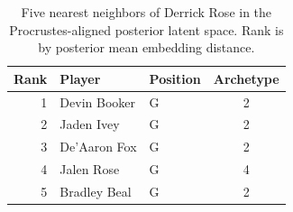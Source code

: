 \begin{table}[htbp]
  \centering\small
  \begin{tabular}{rllc}
    \toprule
    Rank & Player & Position & Archetype \\
    \midrule
    1 & Devin Booker & G & 2 \\
    2 & Jaden Ivey & G & 2 \\
    3 & De'Aaron Fox & G & 2 \\
    4 & Jalen Rose & G & 4 \\
    5 & Bradley Beal & G & 2 \\
    \bottomrule
  \end{tabular}
  \caption{Five nearest neighbors of Derrick Rose in the Procrustes-aligned posterior latent space. Rank is by posterior mean embedding distance.}
  \label{tab:Derrick_Rose_neighbors}
\end{table}

